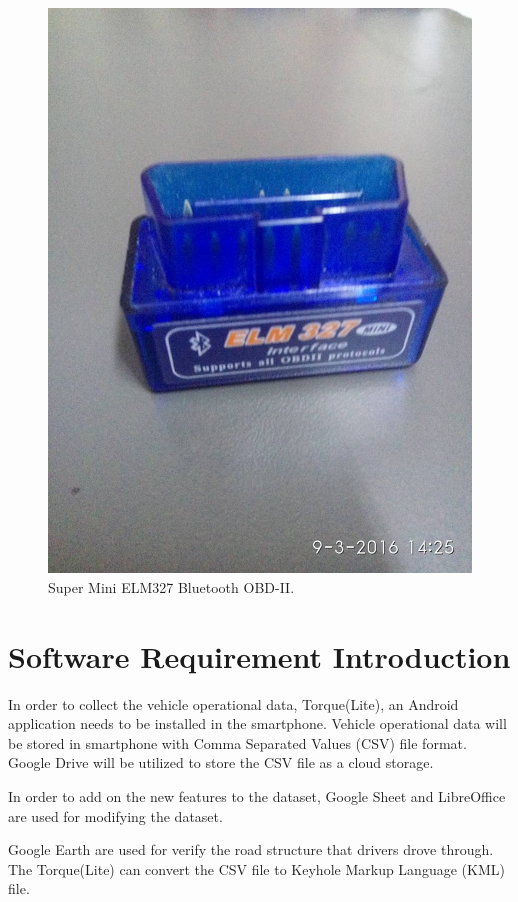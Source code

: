 \begin{figure}[hbt!]\centering
\includegraphics[height=.5\textheight]{image/ELM327}
\caption{Super Mini ELM327 Bluetooth OBD-II.}
\end{figure}

\section{Software Requirement Introduction}
In order to collect the vehicle operational data, Torque(Lite), an Android application needs to be installed in the smartphone. Vehicle operational data will be stored in smartphone with Comma Separated Values (CSV) file format. Google Drive will be utilized to store the CSV file as a cloud storage.

In order to add on the new features to the dataset, Google Sheet and LibreOffice are used for modifying the dataset. 

Google Earth are used for verify the road structure that drivers drove through. The Torque(Lite) can convert the CSV file to Keyhole Markup Language (KML) file.
 
